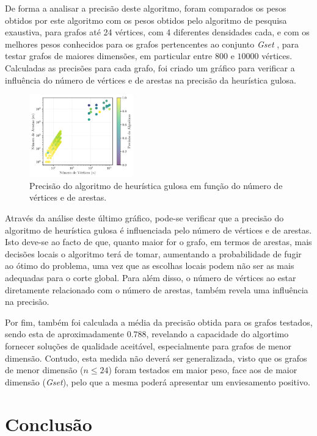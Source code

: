 \documentclass[mirror, portugues]{revdetua}
\begin{document}
De forma a analisar a precisão deste algoritmo, foram comparados os pesos obtidos por este algoritmo com os pesos obtidos pelo algoritmo de pesquisa exaustiva, para grafos até 24 vértices, com 4 diferentes densidades cada, e com os melhores pesos conhecidos para os grafos pertencentes ao conjunto \textit{Gset} \cite{GS24, ME19}, para testar grafos de maiores dimensões, em particular entre $800$ e $10000$ vértices. Calculadas as precisões para cada grafo, foi criado um gráfico para verificar a influência do número de vértices e de arestas na precisão da heurística gulosa.

\begin{figure}[h]
    \centering
    \includegraphics[width=0.4\textwidth]{../assets/precHEU.png}
    \caption{Precisão do algoritmo de heurística gulosa em função do número de vértices e de arestas.}
    \label{fig:precheu}
\end{figure}

Através da análise deste último gráfico, pode-se verificar que a precisão do algoritmo de heurística gulosa é influenciada pelo número de vértices e de arestas. Isto deve-se ao facto de que, quanto maior for o grafo, em termos de arestas, mais decisões locais o algoritmo terá de tomar, aumentando a probabilidade de fugir ao ótimo do problema, uma vez que as escolhas locais podem não ser as mais adequadas para o corte global. Para além disso, o número de vértices ao estar diretamente relacionado com o número de arestas, também revela uma influência na precisão.

Por fim, também foi calculada a média da precisão obtida para os grafos testados, sendo esta de aproximadamente $0.788$, revelando a capacidade do algortimo fornecer soluções de qualidade aceitável, especialmente para grafos de menor dimensão. Contudo, esta medida não deverá ser generalizada, visto que os grafos de menor dimensão ($n \leq 24$) foram testados em maior peso, face aos de maior dimensão (\textit{Gset}), pelo que a mesma poderá apresentar um enviesamento positivo.

\section{Conclusão}
\end{document}
